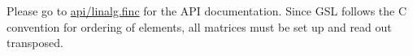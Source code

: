 Please go to \hyperlink{linalg_8finc}{api/linalg.\-finc} for the A\-P\-I documentation. Since G\-S\-L follows the C convention for ordering of elements, all matrices must be set up and read out transposed. 